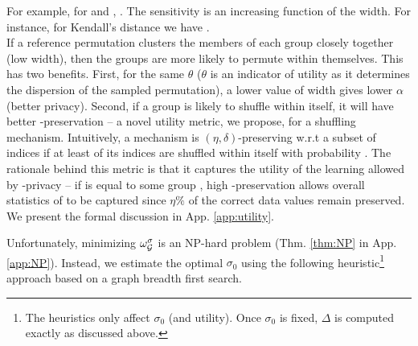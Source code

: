 For example, for \scalebox{0.9}{$\sigma=(1\:3\:7\:8\:6\:4\:5\:2\:9\:10)$} and , . The sensitivity is an increasing function of the width. For instance, for Kendall's \scalebox{0.9}{$\tau$} distance  we have . \\If a reference permutation clusters the members of each group closely together (low width), then the groups are more likely to permute within themselves. This has two benefits. First, for the same $\theta$ ($\theta$ is an indicator of utility as it determines the dispersion of the sampled permutation), a lower value of width gives lower $\alpha$ (better privacy).  Second, if a group is likely to shuffle within itself, it will have better \scalebox{0.9}{$(\eta, \delta)$}-preservation -- a novel utility metric, we propose, for a shuffling mechanism. Intuitively, a mechanism is $(\eta,\delta)$-preserving w.r.t a subset of indices \scalebox{0.9}{$S \subset [n]$} if at least \scalebox{0.9}{$\eta\%$}  of its indices are shuffled within itself with probability \scalebox{0.9}{$(1-\delta)$}. The rationale behind this metric is that it captures the utility of the learning allowed by \name-privacy -- if \scalebox{0.9}{$S$} is equal to some group \scalebox{0.9}{$G \in \calG$}, high \scalebox{0.9}{$(\eta, \delta)$}-preservation allows overall statistics of \scalebox{0.9}{$G$} to be captured since $\eta\%$ of the correct data values remain preserved.   We present the formal discussion in App. \ref{app:utility}. 
    


Unfortunately, minimizing $\omega_{\mathcal{G}}^\sigma$ is an NP-hard problem (Thm. \ref{thm:NP} in App. \ref{app:NP}). Instead, we estimate the optimal $\sigma_0$ using the following heuristic\footnote{The heuristics only affect $\sigma_0$ (and utility). Once $\sigma_0$ is fixed, $\Delta$ is computed exactly as discussed above.} approach based on a graph breadth first search. 

